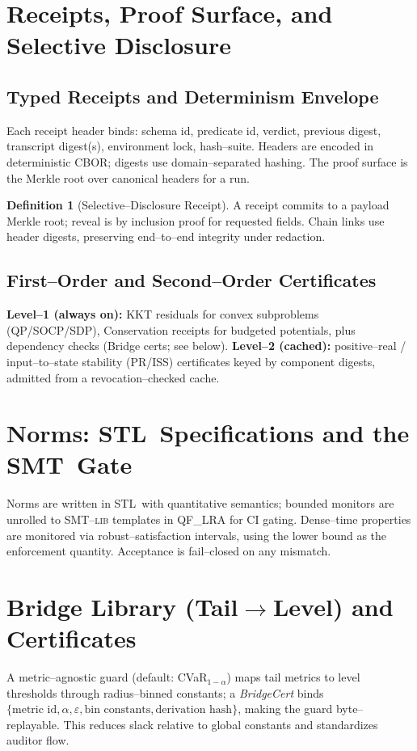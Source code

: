 \documentclass[11pt]{article}
\theoremstyle{plain}
\theoremstyle{definition}
\newtheorem{definition}[theorem]{Definition}
\theoremstyle{remark}
\newcommand{\cbor}{\textsc{CBOR}}
\newcommand{\stl}{\textsc{STL}}
\newcommand{\smt}{\textsc{SMT}}
\begin{document}
\section{Receipts, Proof Surface, and Selective Disclosure}
\subsection{Typed Receipts and Determinism Envelope}
Each receipt header binds: schema id, predicate id, verdict, previous digest, transcript digest(s), environment lock, hash--suite. Headers are encoded in deterministic \cbor; digests use domain--separated hashing. The proof surface is the Merkle root over canonical headers for a run.

\begin{definition}[Selective--Disclosure Receipt]
A receipt commits to a payload Merkle root; reveal is by inclusion proof for requested fields. Chain links use header digests, preserving end--to--end integrity under redaction.
\end{definition}

\subsection{First--Order and Second--Order Certificates}
\textbf{Level--1 (always on):} KKT residuals for convex subproblems (QP/SOCP/SDP), Conservation receipts for budgeted potentials, plus dependency checks (Bridge certs; see below). \textbf{Level--2 (cached):} positive--real / input--to--state stability (PR/ISS) certificates keyed by component digests, admitted from a revocation--checked cache.

\section{Norms: \stl\ Specifications and the \smt\ Gate}
Norms are written in \stl\ with quantitative semantics; bounded monitors are unrolled to \smt--\textsc{lib} templates in QF\_LRA for CI gating. Dense--time properties are monitored via robust--satisfaction intervals, using the lower bound as the enforcement quantity. Acceptance is fail--closed on any mismatch.

\section{Bridge Library (Tail$\to$Level) and Certificates}
A metric--agnostic guard (default: CVaR$_{1-\alpha}$) maps tail metrics to level thresholds through radius--binned constants; a \emph{BridgeCert} binds $\{\text{metric id},\alpha,\varepsilon,\text{bin constants},\text{derivation hash}\}$, making the guard byte--replayable. This reduces slack relative to global constants and standardizes auditor flow.
\end{document}
